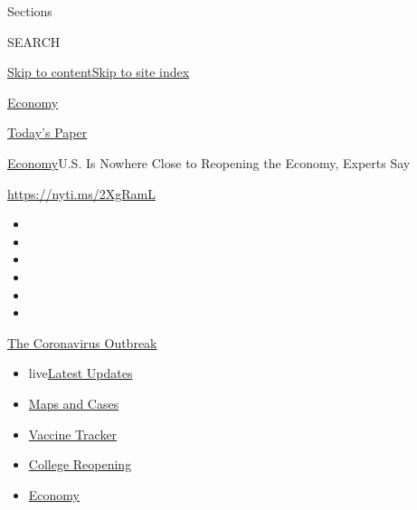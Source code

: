 Sections

SEARCH

\protect\hyperlink{site-content}{Skip to
content}\protect\hyperlink{site-index}{Skip to site index}

\href{https://www.nytimes3xbfgragh.onion/section/business/economy}{Economy}

\href{https://myaccount.nytimes3xbfgragh.onion/auth/login?response_type=cookie\&client_id=vi}{}

\href{https://www.nytimes3xbfgragh.onion/section/todayspaper}{Today's
Paper}

\href{/section/business/economy}{Economy}\textbar{}U.S. Is Nowhere Close
to Reopening the Economy, Experts Say

\url{https://nyti.ms/2XgRamL}

\begin{itemize}
\item
\item
\item
\item
\item
\item
\end{itemize}

\href{https://www.nytimes3xbfgragh.onion/news-event/coronavirus?action=click\&pgtype=Article\&state=default\&region=TOP_BANNER\&context=storylines_menu}{The
Coronavirus Outbreak}

\begin{itemize}
\tightlist
\item
  live\href{https://www.nytimes3xbfgragh.onion/2020/08/04/world/coronavirus-covid-19.html?action=click\&pgtype=Article\&state=default\&region=TOP_BANNER\&context=storylines_menu}{Latest
  Updates}
\item
  \href{https://www.nytimes3xbfgragh.onion/interactive/2020/us/coronavirus-us-cases.html?action=click\&pgtype=Article\&state=default\&region=TOP_BANNER\&context=storylines_menu}{Maps
  and Cases}
\item
  \href{https://www.nytimes3xbfgragh.onion/interactive/2020/science/coronavirus-vaccine-tracker.html?action=click\&pgtype=Article\&state=default\&region=TOP_BANNER\&context=storylines_menu}{Vaccine
  Tracker}
\item
  \href{https://www.nytimes3xbfgragh.onion/2020/08/02/us/covid-college-reopening.html?action=click\&pgtype=Article\&state=default\&region=TOP_BANNER\&context=storylines_menu}{College
  Reopening}
\item
  \href{https://www.nytimes3xbfgragh.onion/live/2020/08/03/business/stock-market-today-coronavirus?action=click\&pgtype=Article\&state=default\&region=TOP_BANNER\&context=storylines_menu}{Economy}
\end{itemize}

